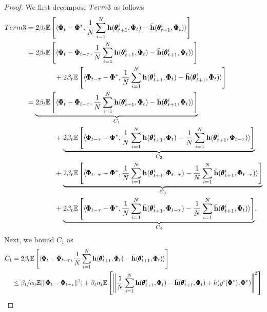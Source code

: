 \documentclass{article} %
\theoremstyle{plain}
\theoremstyle{definition}
\theoremstyle{remark}
\begin{document}
{\begin{proof}
We first decompose $\textnormal{Term 3}$ as follows
\begin{align*}
    \textnormal{Term 3}&=2\beta_t\mathbb{E}\left[\langle\pmb{\Phi}_t-\pmb{\Phi}^*, \frac{1}{N}\sum_{i=1}^N\bh(\pmb{\theta}_{t+1}^i, \pmb{\Phi}_t)-\bar{\bh}(\pmb{\theta}_{t+1}^i, \pmb{\Phi}_t)\rangle\right]\allowdisplaybreaks\\
&=2\beta_t\mathbb{E}\left[\langle\pmb{\Phi}_t-\pmb{\Phi}_{t-\tau}, \frac{1}{N}\sum_{i=1}^N\bh(\pmb{\theta}_{t+1}^i, \pmb{\Phi}_t)-\bar{\bh}(\pmb{\theta}_{t+1}^i, \pmb{\Phi}_t)\rangle\right]\allowdisplaybreaks\\
&\qquad\qquad+2\beta_t\mathbb{E}\left[\langle\pmb{\Phi}_{t-\tau}-\pmb{\Phi}^*, \frac{1}{N}\sum_{i=1}^N\bh(\pmb{\theta}_{t+1}^i, \pmb{\Phi}_t)-\bar{\bh}(\pmb{\theta}_{t+1}^i, \pmb{\Phi}_t)\rangle\right]\allowdisplaybreaks\\
    &=\underset{C_1}{\underbrace{2\beta_t\mathbb{E}\left[\langle\pmb{\Phi}_t-\pmb{\Phi}_{t-\tau}, \frac{1}{N}\sum_{i=1}^N\bh(\pmb{\theta}_{t+1}^i, \pmb{\Phi}_t)-\bar{\bh}(\pmb{\theta}_{t+1}^i, \pmb{\Phi}_t)\rangle\right]}}\allowdisplaybreaks\\
    &\qquad\qquad+\underset{C_2}{\underbrace{2\beta_t\mathbb{E}\left[\langle\pmb{\Phi}_{t-\tau}-\pmb{\Phi}^*, \frac{1}{N}\sum_{i=1}^N\bh(\pmb{\theta}_{t+1}^i, \pmb{\Phi}_t)- \frac{1}{N}\sum_{i=1}^N\bh(\pmb{\theta}_{t+1}^i, \pmb{\Phi}_{t-\tau})\rangle\right]}}\allowdisplaybreaks\\
    &\qquad\qquad+\underset{C_3}{\underbrace{2\beta_t\mathbb{E}\left[\langle\pmb{\Phi}_{t-\tau}-\pmb{\Phi}^*, \frac{1}{N}\sum_{i=1}^N\bh(\pmb{\theta}_{t+1}^i, \pmb{\Phi}_{t-\tau})- \frac{1}{N}\sum_{i=1}^N\bar{\bh}(\pmb{\theta}_{t+1}^i, \pmb{\Phi}_{t-\tau})\rangle\right]}}\allowdisplaybreaks\\
    &\qquad\qquad+\underset{C_4}{\underbrace{2\beta_t\mathbb{E}\left[\langle\pmb{\Phi}_{t-\tau}-\pmb{\Phi}^*, \frac{1}{N}\sum_{i=1}^N\bar{\bh}(\pmb{\theta}_{t+1}^i, \pmb{\Phi}_{t-\tau})- \frac{1}{N}\sum_{i=1}^N\bar{\bh}(\pmb{\theta}_{t+1}^i, \pmb{\Phi}_{t})\rangle\right]}}.
\end{align*}
Next, we bound $C_1$ as
\begin{align*}
    C_1&=2\beta_t\mathbb{E}\left[\langle\pmb{\Phi}_t-\pmb{\Phi}_{t-\tau}, \frac{1}{N}\sum_{i=1}^N\bh(\pmb{\theta}_{t+1}^i, \pmb{\Phi}_t)-\bar{\bh}(\pmb{\theta}_{t+1}^i, \pmb{\Phi}_t)\rangle\right]\\
    &\leq  \beta_t/\alpha_t\mathbb{E}[\|\pmb{\Phi}_t-\pmb{\Phi}_{t-\tau}\|^2] + \beta_t\alpha_t\mathbb{E}\left[\left\|\frac{1}{N}\sum_{i=1}^N \bh(\pmb{\theta}_{t+1}^i, \pmb{\Phi}_t)-\bar{\bh}(\pmb{\theta}_{t+1}^i, \pmb{\Phi}_t)+\bar{h}(y^i(\pmb{\Phi}^{*}), \pmb{\Phi}^*)\right\|^2\right]\\

\end{align*}
\end{proof}}
\end{document}
